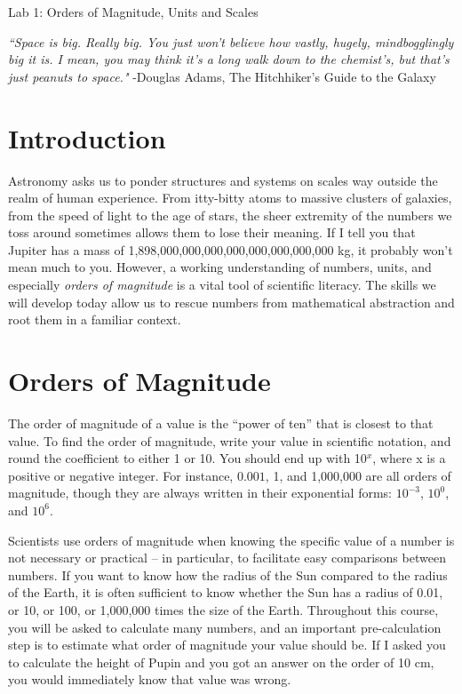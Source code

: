 \documentclass[12pt]{article}
\begin{document}
\thispagestyle{empty}
 \begin{center}
{\huge Lab 1: Orders of Magnitude, Units and Scales}\\
\end{center}


\begin{center}
\noindent \textit{``Space is big. Really big. You just won't believe how vastly, hugely, mindbogglingly big it is. I mean, you may think it's a long walk down to the chemist's, but that's just peanuts to space."}
-Douglas Adams, The Hitchhiker's Guide to the Galaxy
\end{center}

\section*{Introduction}

Astronomy asks us to ponder structures and systems on scales way outside the realm of human experience. From itty-bitty atoms to massive clusters of galaxies, from the speed of light to the age of stars, the sheer extremity of the numbers we toss around sometimes allows them to lose their meaning. If I tell you that Jupiter has a mass of 1,898,000,000,000,000,000,000,000,000 kg, it probably won't mean much to you. However, a working understanding of numbers, units, and especially \textit{orders of magnitude} is a vital tool of scientific literacy. The skills we will develop today allow us to rescue numbers from mathematical abstraction and root them in a familiar context. 

\section*{Orders of Magnitude}

The order of magnitude of a value is the ``power of ten'' that is closest to that value. To find the order of magnitude, write your value in scientific notation, and round the coefficient to either 1 or 10. You should end up with 10${^x}$, where x is a positive or negative integer. For instance, $0.001$, 1, and 1,000,000 are all orders of magnitude, though they are always written in their exponential forms:
$10^{-3}$, $10^0$, and $10^6$.  

Scientists use orders of magnitude when knowing the specific value of a number is not necessary or practical -- in particular, to facilitate easy comparisons between numbers. If you want to know how the radius of the Sun compared to the radius of the Earth, it is often sufficient to know whether the Sun has a radius of 0.01, or 10, or 100, or 1,000,000 times the size of the Earth. Throughout this course, you will be asked to calculate many numbers, and an important pre-calculation step is to estimate what order of magnitude your value should be. If I asked you to calculate the height of Pupin and you got an answer on the order of 10 cm, you would immediately know that value was wrong.
\end{document}

